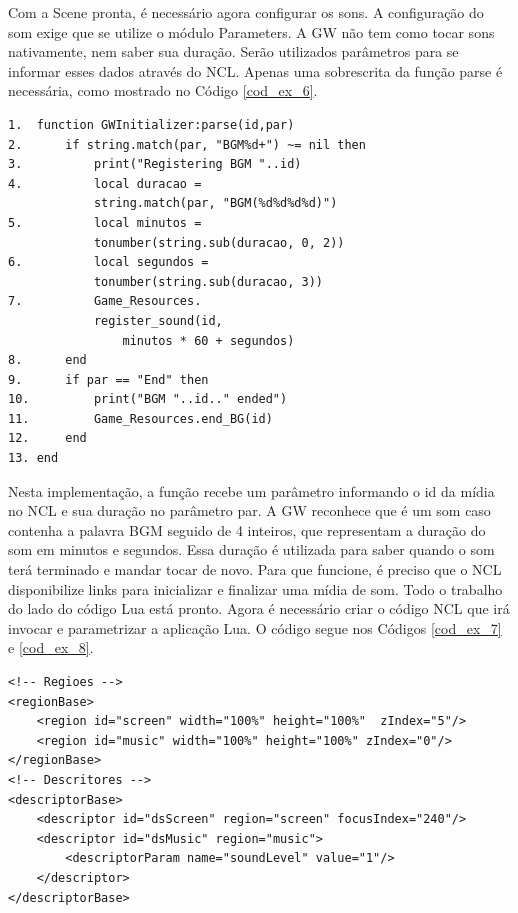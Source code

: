 \documentclass[
	12pt,				%
	openright,			%
	oneside,			%
	a4paper,			%
	brazil,				%
	]{abntex2}
\begin{document}
Com a Scene pronta, é necessário agora configurar os sons. A configuração do som exige que se utilize o módulo Parameters. A GW não tem como tocar sons nativamente, nem saber sua duração. Serão utilizados parâmetros para se informar esses dados através do NCL. Apenas uma sobrescrita da função parse é necessária, como mostrado no Código \ref{cod_ex_6}.

\begin{lstlisting}[caption={Código dos Parâmetros},label=cod_ex_6,frame=single]
1.	function GWInitializer:parse(id,par)
2.		if string.match(par, "BGM%d+") ~= nil then
3.			print("Registering BGM "..id)
4.			local duracao = 
			string.match(par, "BGM(%d%d%d%d)")
5.			local minutos = 
			tonumber(string.sub(duracao, 0, 2))
6.			local segundos = 
			tonumber(string.sub(duracao, 3))
7.			Game_Resources.
			register_sound(id, 
				minutos * 60 + segundos)
8.		end
9.		if par == "End" then
10.			print("BGM "..id.." ended")
11.			Game_Resources.end_BG(id)
12.		end
13.	end
\end{lstlisting}

Nesta implementação, a função recebe um parâmetro informando o id da mídia no NCL e sua duração no parâmetro par. A GW reconhece que é um som caso contenha a palavra BGM seguido de 4 inteiros, que representam a duração do som em minutos e segundos. Essa duração é utilizada para saber quando o som terá terminado e mandar tocar de novo. Para que funcione, é preciso que o NCL disponibilize links para inicializar e finalizar uma mídia de som. 
Todo o trabalho do lado do código Lua está pronto. Agora é necessário criar o código NCL que irá invocar e parametrizar a aplicação Lua. O código segue nos Códigos \ref{cod_ex_7} e \ref{cod_ex_8}.

\begin{lstlisting}[caption={Regiões e Descritores de Exemplo},label=cod_ex_7,frame=single]
<!-- Regioes -->
<regionBase>
    <region id="screen" width="100%" height="100%"  zIndex="5"/>
    <region id="music" width="100%" height="100%" zIndex="0"/>
</regionBase>
<!-- Descritores -->
<descriptorBase>
    <descriptor id="dsScreen" region="screen" focusIndex="240"/>
    <descriptor id="dsMusic" region="music">
        <descriptorParam name="soundLevel" value="1"/>
    </descriptor>                
</descriptorBase>
\end{lstlisting}
\end{document}
